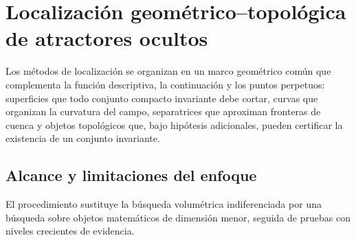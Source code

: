 \section{Localización geométrico--topológica de atractores ocultos}
\label{sec:localizacion-geometrico-topologica}

\HAFOCardGeometric

Los métodos de localización se organizan en un marco geométrico común que
complementa la función descriptiva, la continuación y los puntos perpetuos:
superficies que todo conjunto compacto invariante debe cortar, curvas que
organizan la curvatura del campo, separatrices que aproximan fronteras de
cuenca y objetos topológicos que, bajo hipótesis adicionales, pueden
certificar la existencia de un conjunto invariante.

\begin{center}
\end{center}

\subsection{Alcance y limitaciones del enfoque}
\label{subsec:gt-ventajas}

El procedimiento sustituye la búsqueda volumétrica indiferenciada por una
búsqueda sobre objetos matemáticos de dimensión menor, seguida de pruebas con
niveles crecientes de evidencia.

